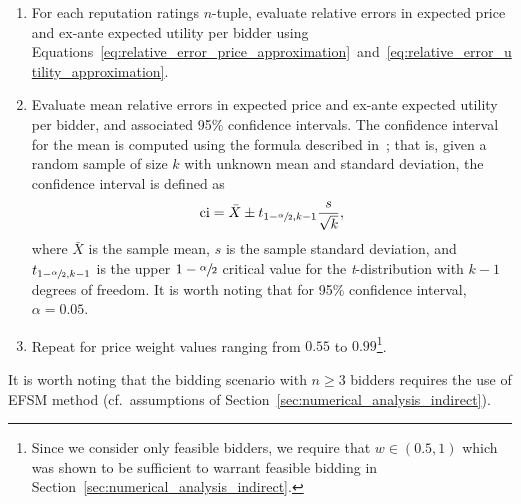 \begin{enumerate}
\item For each reputation ratings $n$-tuple, evaluate relative errors in expected price and ex-ante expected utility per bidder using Equations~\eqref{eq:relative_error_price_approximation}~and~\eqref{eq:relative_error_utility_approximation}.
\item Evaluate mean relative errors in expected price and ex-ante expected utility per bidder, and associated 95\% confidence intervals. The confidence interval for the mean is computed using the formula described in~\cite{LawChapter42007}; that is, given a random sample of size $k$ with unknown mean and standard deviation, the confidence interval is defined as
\begin{equation*}
  \text{ci}=\bar{X}\pm t_{1-\sfrac{\alpha}{2},k-1}\frac{s}{\sqrt{k}},
\end{equation*}
where $\bar{X}$ is the sample mean, $s$ is the sample standard deviation, and $t_{1-\sfrac{\alpha}{2}, k-1}$ is the upper $1-\sfrac{\alpha}{2}$ critical value for the \emph{t}-distribution with $k-1$ degrees of freedom. It is worth noting that for 95\% confidence interval, $\alpha=0.05$.
\item Repeat for price weight values ranging from $0.55$ to $0.99$\footnote{Since we consider only feasible bidders, we require that $w\in(0.5,1)$ which was shown to be sufficient to warrant feasible bidding in Section~\ref{sec:numerical_analysis_indirect}.}.
\end{enumerate}
It is worth noting that the bidding scenario with $n\geq 3$ bidders requires the use of EFSM method (cf.~assumptions of Section~\ref{sec:numerical_analysis_indirect}).

